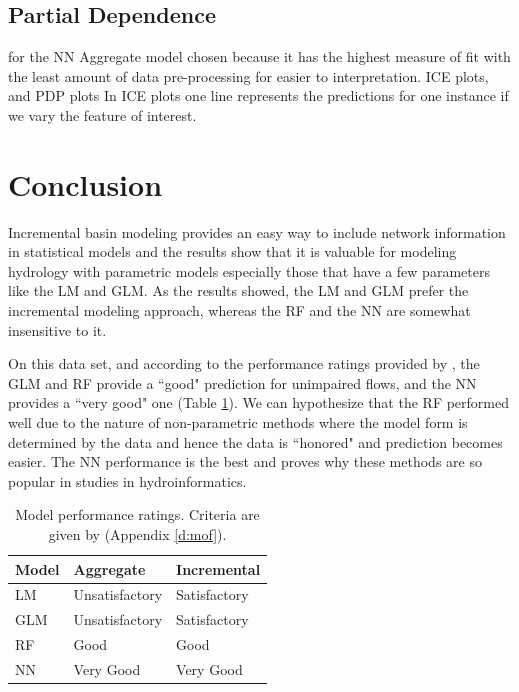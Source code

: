 
\subsection{Partial Dependence}
for the NN Aggregate model chosen because it has the highest measure of fit with the least amount of data pre-processing for easier to interpretation.  
ICE plots, and PDP plots
In ICE plots one line represents the predictions for one instance if we vary the feature of interest.

\section{Conclusion}
Incremental basin modeling provides an easy way to include network information in statistical models and the results show that it is valuable for modeling hydrology with parametric models especially those that have a few parameters like the LM and GLM. As the results showed, the LM and GLM prefer the incremental modeling approach, whereas the RF and the NN are somewhat insensitive to it. 

On this data set, and according to the performance ratings provided by , the GLM and RF provide a ``good" prediction for unimpaired flows, and the NN provides a ``very good" one (Table \ref{table:modelperformance}). We can hypothesize that the RF performed well due to the nature of non-parametric methods where the model form is determined by the data and hence the data is ``honored" and prediction becomes easier. The NN performance is the best and proves why these methods are so popular in studies in hydroinformatics. 

\begin{table}[h]\renewcommand{\arraystretch}{1} 
	\linespread{1.0}
	\centering
	\caption{Model performance ratings. Criteria are given by \protect{} (Appendix \ref{d:mof}).}
	\begin{tabular}{p{5cm}p{5cm}p{5cm}} %
		\toprule
		Model & Aggregate & Incremental  \\
		\midrule
		LM & Unsatisfactory & Satisfactory \\
		\addlinespace
		GLM & Unsatisfactory & Satisfactory \\
		\addlinespace
		RF & Good & Good \\
		\addlinespace
		NN & Very Good & Very Good \\
		\bottomrule
	\end{tabular}
	\label{table:modelperformance}
\end{table}

